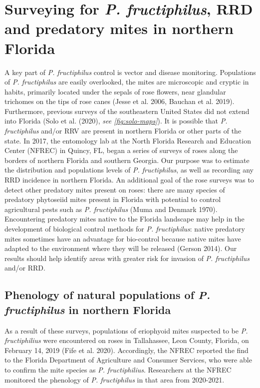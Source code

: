 \documentclass[12pt,final,CPage]{ufthesis}
\begin{document}
{{  \section{\texorpdfstring{Surveying for \emph{P. fructiphilus}, RRD and predatory mites in northern Florida}{Surveying for P. fructiphilus, RRD and predatory mites in northern Florida}}\label{intro-survey}}

  A key part of \emph{P. fructiphilus} control is vector and disease monitoring. Populations of \emph{P. fructiphilus} are easily overlooked, the mites are microscopic and cryptic in habits, primarily located under the sepals of rose flowers, near glandular trichomes on the tips of rose canes (Jesse et al. 2006, Bauchan et al. 2019). Furthermore, previous surveys of the southeastern United States did not extend into Florida (Solo et al. (2020), \emph{see \ref{fig:solo-maps}}). It is possible that \emph{P. fructiphilus} and/or RRV are present in northern Florida or other parts of the state. In 2017, the entomology lab at the North Florida Research and Education Center (NFREC) in Quincy, FL, began a series of surveys of roses along the borders of northern Florida and southern Georgia. Our purpose was to estimate the distribution and populations levels of \emph{P. fructiphilus}, as well as recording any RRD incidence in northern Florida. An additional goal of the rose surveys was to detect other predatory mites present on roses: there are many species of predatory phytoseiid mites present in Florida with potential to control agricultural pests such as \emph{P. fructiphilus} (Muma and Denmark 1970). Encountering predatory mites native to the Florida landscape may help in the development of biological control methods for \emph{P. fructiphilus}: native predatory mites sometimes have an advantage for bio-control because native mites have adapted to the environment where they will be released (Gerson 2014). Our results should help identify areas with greater risk for invasion of \emph{P. fructiphilus} and/or RRD.

  \hypertarget{intro-pheno}{%
  \subsection{\texorpdfstring{Phenology of natural populations of \emph{P. fructiphilus} in northern Florida}{Phenology of natural populations of P. fructiphilus in northern Florida}}\label{intro-pheno}}

  As a result of these surveys, populations of eriophyoid mites suspected to be \emph{P. fructiphilius} were encountered on roses in Tallahassee, Leon County, Florida, on February 14, 2019 (Fife et al. 2020). Accordingly, the NFREC reported the find to the Florida Department of Agriculture and Consumer Services, who were able to confirm the mite species as \emph{P. fructiphilius}. Researchers at the NFREC monitored the phenology of \emph{P. fructiphilus} in that area from 2020-2021.

}
\end{document}
